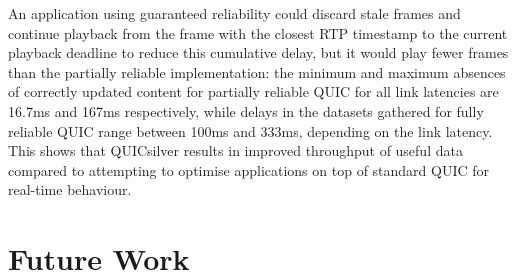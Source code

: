 \documentclass{mpaper}
\begin{document}
An application using guaranteed reliability could discard stale frames and continue playback from the frame with the closest RTP timestamp to the current playback deadline to reduce this cumulative delay, but it would play fewer frames than the partially reliable implementation: the minimum and maximum absences of correctly updated content for partially reliable QUIC for all link latencies are 16.7ms and 167ms respectively, while delays in the datasets gathered for fully reliable QUIC range between 100ms and 333ms, depending on the link latency. This shows that QUICsilver results in improved throughput of useful data compared to attempting to optimise applications on top of standard QUIC for real-time behaviour.


%
% 



\section{Future Work}
\end{document}
